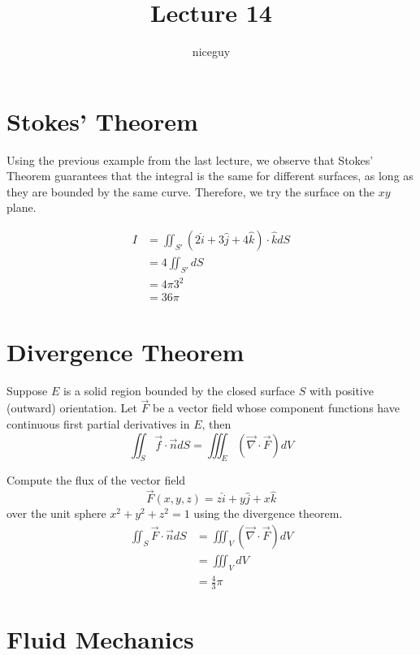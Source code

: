 \documentclass[12pt]{article}
\author{niceguy}
\title{Lecture 14}
\begin{document}
\maketitle

\section{Stokes' Theorem}

Using the previous example from the last lecture, we observe that Stokes' Theorem guarantees that the integral is the same for different surfaces, as long as they are bounded by the same curve. Therefore, we try the surface on the $xy$ plane.

\begin{align*}
	I &= \iint_{S'} (2\hat{i} + 3\hat{j} + 4\hat{k})\cdot\hat{k}dS \\
	  &= 4\iint_{S'}dS \\
	  &= 4\pi3^2 \\
	  &= 36\pi
\end{align*}

\section{Divergence Theorem}

\begin{thm}
	Suppose $E$ is a solid region bounded by the closed surface $S$ with positive (outward) orientation. Let $\vec{F}$ be a vector field whose component functions have continuous first partial derivatives in $E$, then
	$$\iint_S\vec{f}\cdot\vec{n}dS = \iiint_E\left(\vec{\nabla}\cdot\vec{F}\right)dV$$
\end{thm}

\begin{ex}
	Compute the flux of the vector field
	$$\vec{F}(x,y,z) = z\hat{i} + y\hat{j} + x\hat{k}$$
	over the unit sphere $x^2+y^2+z^2=1$ using the divergence theorem.
	\begin{align*}
		\iint_S \vec{F}\cdot\vec{n}dS &= \iiint_V\left(\vec{\nabla}\cdot\vec{F}\right)dV \\
					      &= \iiint_VdV \\
					      &= \frac{4}{3}\pi
	\end{align*}
\end{ex}

\section{Fluid Mechanics}
\end{document}
